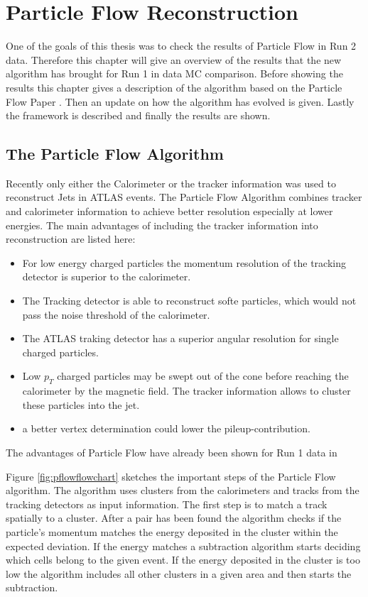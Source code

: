 \chapter{Particle Flow Reconstruction}

One of the goals of this thesis was to check the results of Particle Flow in Run 2 data. Therefore this chapter will give an overview of the results that the new algorithm has brought for Run 1 in data MC comparison. Before showing the results this chapter gives a description of the algorithm based on the Particle Flow Paper \cite{pflow16}. Then an update on how the algorithm has evolved is given. Lastly the framework is described and finally the results are shown.

\section{The Particle Flow Algorithm}

Recently only either the Calorimeter or the tracker information was used to reconstruct Jets in ATLAS events. The Particle Flow Algorithm combines tracker and calorimeter information to achieve better resolution especially at lower energies. The main advantages of including the tracker information into reconstruction are listed here:


\begin{itemize}
\item For low energy charged particles the momentum resolution of the tracking detector is superior to the calorimeter.
\item The Tracking detector is able to reconstruct softe particles, which would not pass the noise threshold of the calorimeter.
\item The ATLAS traking detector has a superior angular resolution for single charged particles.
\item Low $p_T$ charged particles may be swept out of the cone before reaching the calorimeter by the magnetic field. The tracker information allows to cluster these particles into the jet.
\item a better vertex determination could lower the pileup-contribution.
\end{itemize}

The advantages of Particle Flow have already been shown for Run 1 data in

Figure \ref{fig:pflowflowchart} sketches the important steps of the Particle Flow algorithm. The algorithm uses clusters from the calorimeters and tracks from the tracking detectors as input information. The first step is to match a track spatially to a cluster. After a pair has been found the algorithm checks if the particle's momentum matches the energy deposited in the cluster within the expected deviation. If the energy matches a subtraction algorithm starts deciding which cells belong to the given event. If the energy deposited in the cluster is too low the algorithm includes all other clusters in a given area and then starts the subtraction.

